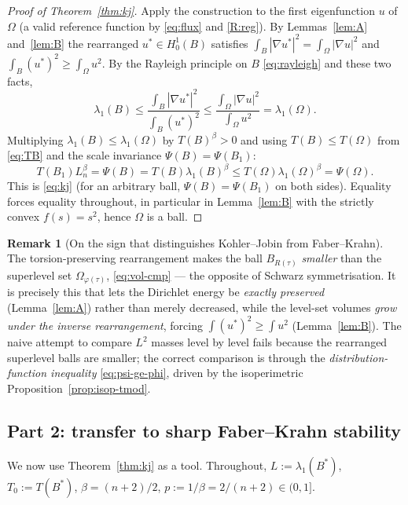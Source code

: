 \documentclass[11pt]{amsart}
\theoremstyle{definition}
\newtheorem{remark}[theorem]{Remark}
\newcommand{\Om}{\Omega}
\newcommand{\abs}[1]{\left|#1\right|}
\begin{document}
\begin{proof}[Proof of Theorem~\ref{thm:kj}]
Apply the construction to the first eigenfunction $u$ of $\Om$ (a valid
reference function by \eqref{eq:flux} and \ref{R:reg}). By
Lemmas~\ref{lem:A} and~\ref{lem:B} the rearranged $u^*\in H^1_0(B)$
satisfies $\int_B\abs{\nabla u^*}^2=\int_\Om\abs{\nabla u}^2$ and
$\int_B(u^*)^2\ge\int_\Om u^2$. By the Rayleigh principle on $B$
\eqref{eq:rayleigh} and these two facts,
\[
  \lambda_1(B)\le
  \frac{\int_B\abs{\nabla u^*}^2}{\int_B(u^*)^2}
  \le\frac{\int_\Om\abs{\nabla u}^2}{\int_\Om u^2}
  =\lambda_1(\Om).
\]
Multiplying $\lambda_1(B)\le\lambda_1(\Om)$ by $T(B)^\beta>0$ and using
$T(B)\le T(\Om)$ from \eqref{eq:TB} and the scale invariance
$\Psi(B)=\Psi(B_1)$:
\[
  T(B_1)L_n^\beta=\Psi(B)=T(B)\lambda_1(B)^\beta
  \le T(\Om)\lambda_1(\Om)^\beta=\Psi(\Om).
\]
This is \eqref{eq:kj} (for an arbitrary ball, $\Psi(B)=\Psi(B_1)$ on both
sides). Equality forces equality throughout, in particular in
Lemma~\ref{lem:B} with the strictly convex $f(s)=s^2$, hence $\Om$ is a
ball.
\end{proof}

\begin{remark}[On the sign that distinguishes Kohler--Jobin from Faber--Krahn]
\label{rem:sign}
The torsion-preserving rearrangement makes the ball
$B_{R(\tau)}$ \emph{smaller} than the superlevel set
$\Om_{\varphi(\tau)}$, \eqref{eq:vol-cmp} — the opposite of Schwarz
symmetrisation. It is precisely this that lets the Dirichlet energy be
\emph{exactly preserved} (Lemma~\ref{lem:A}) rather than merely decreased,
while the level-set volumes \emph{grow under the inverse rearrangement},
forcing $\int(u^*)^2\ge\int u^2$ (Lemma~\ref{lem:B}). The naive attempt to
compare $L^2$ masses level by level fails because the rearranged superlevel
balls are smaller; the correct comparison is through the
\emph{distribution-function inequality} \eqref{eq:psi-ge-phi}, driven by the
isoperimetric Proposition~\ref{prop:isop-tmod}.
\end{remark}

\subsection{Part 2: transfer to sharp Faber--Krahn stability}
\label{ssec:transfer}

We now use Theorem~\ref{thm:kj} as a tool. Throughout, $L:=\lambda_1(B^*)$,
$T_0:=T(B^*)$, $\beta=(n+2)/2$, $p:=1/\beta=2/(n+2)\in(0,1]$.
\end{document}
